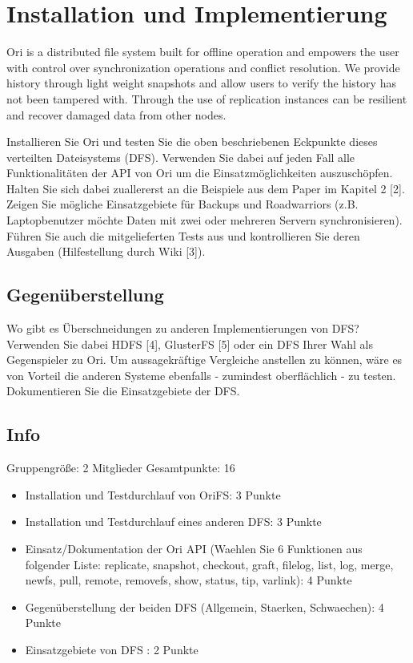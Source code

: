 
\section{Installation und Implementierung}
\begin{center}
	Ori is a distributed file system built for offline operation and empowers the user with
	control over synchronization operations and conflict resolution. We provide history
	through light weight snapshots and allow users to verify the history has not been
	tampered with. Through the use of replication instances can be resilient and recover
	damaged data from other nodes.
\end{center}
Installieren Sie Ori und testen Sie die oben beschriebenen Eckpunkte dieses verteilten Dateisystems
(DFS). Verwenden Sie dabei auf jeden Fall alle Funktionalitäten der API von Ori um die
Einsatzmöglichkeiten auszuschöpfen. Halten Sie sich dabei zuallererst an die Beispiele aus dem
Paper im Kapitel 2 [2]. Zeigen Sie mögliche Einsatzgebiete für Backups und Roadwarriors (z.B.
Laptopbenutzer möchte Daten mit zwei oder mehreren Servern synchronisieren). Führen Sie auch
die mitgelieferten Tests aus und kontrollieren Sie deren Ausgaben (Hilfestellung durch Wiki [3]).

\subsection{Gegenüberstellung}
Wo gibt es Überschneidungen zu anderen Implementierungen von DFS? Verwenden Sie dabei
HDFS [4], GlusterFS [5] oder ein DFS Ihrer Wahl als Gegenspieler zu Ori. Um aussagekräftige
Vergleiche anstellen zu können, wäre es von Vorteil die anderen Systeme ebenfalls - zumindest
oberflächlich - zu testen. Dokumentieren Sie die Einsatzgebiete der DFS.


\subsection{Info}
Gruppengröße: 2 Mitglieder
Gesamtpunkte: 16
\begin{itemize}
	\item Installation und Testdurchlauf von OriFS: 3 Punkte
	\item Installation und Testdurchlauf eines anderen DFS: 3 Punkte
	\item Einsatz/Dokumentation der Ori API (Waehlen Sie 6 Funktionen aus folgender Liste: replicate, snapshot, checkout, graft, filelog, list, log, merge, newfs, pull, remote, removefs, show, status, tip, varlink): 4 Punkte
	\item Gegenüberstellung der beiden DFS (Allgemein, Staerken, Schwaechen): 4 Punkte
	\item Einsatzgebiete von DFS : 2 Punkte
\end{itemize}


